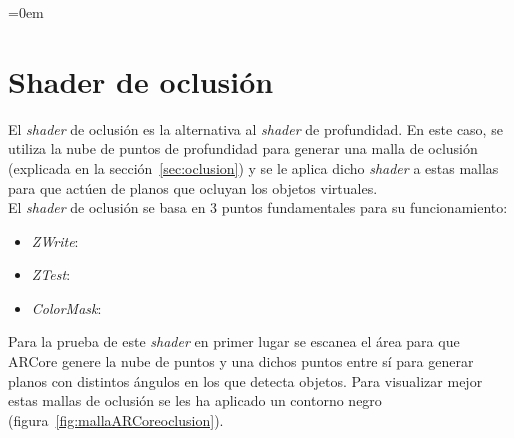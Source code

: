 \parindent=0em
\section{Shader de oclusión}
\noindent

El \textit{shader} de oclusión es la alternativa al \textit{shader} de profundidad. En este caso, se utiliza la nube de puntos de profundidad para generar una malla de oclusión (explicada en la sección~\ref{sec:oclusion}) y se le aplica dicho \textit{shader} a estas mallas para que actúen de planos que ocluyan los objetos virtuales.\\

El \textit{shader} de oclusión se basa en 3 puntos fundamentales para su funcionamiento:

\begin{itemize}
    \item \textit{ZWrite}:
    \item \textit{ZTest}:
    \item \textit{ColorMask}:
\end{itemize}

Para la prueba de este \textit{shader} en primer lugar se escanea el área para que ARCore genere la nube de puntos y una dichos puntos entre sí para generar planos con distintos ángulos en los que detecta objetos. Para visualizar mejor estas mallas de oclusión se les ha aplicado un contorno negro (figura~\ref{fig:mallaARCoreoclusion}).

